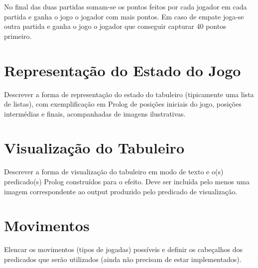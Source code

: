 \documentclass[a4paper]{article}
\begin{document}
No final das duas partidas somam-se os pontos feitos por cada jogador em cada partida e ganha o jogo o jogador com mais pontos. Em caso de empate joga-se outra partida e ganha o jogo o jogador que conseguir capturar 40 pontos primeiro. 

\newpage



\section{Representação do Estado do Jogo}

Descrever a forma de representação do estado do tabuleiro (tipicamente uma lista de listas), com exemplificação em Prolog de posições iniciais do jogo, posições intermédias e finais, acompanhadas de imagens ilustrativas.


\section{Visualização do Tabuleiro}

Descrever a forma de visualização do tabuleiro em modo de texto e o(s) predicado(s) Prolog construídos para o efeito.
Deve ser incluída pelo menos uma imagem correspondente ao output produzido pelo predicado de visualização.


\section{Movimentos}

Elencar os movimentos (tipos de jogadas) possíveis e definir os cabeçalhos dos predicados que serão utilizados (ainda não precisam de estar implementados).
\end{document}
